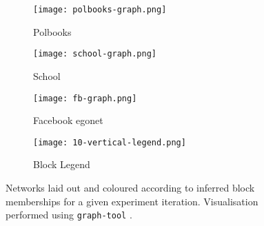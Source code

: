 \begin{figure}[!ht]
	\centering
	\begin{subfigure}[t]{0.28\linewidth}
		\centering
		\texttt{[image: polbooks-graph.png]}
		\caption{Polbooks}
		\label{fig:polbooks-graph}
	\end{subfigure}
	\hfill
	\begin{subfigure}[t]{0.28\linewidth}
		\centering
		\texttt{[image: school-graph.png]}
		\caption{School}
		\label{fig:school-graph}
	\end{subfigure}
	\hfill
	\begin{subfigure}[t]{0.28\linewidth}
		\centering
		\texttt{[image: fb-graph.png]}
		\caption{Facebook egonet}
		\label{fig:fb-graph}
	\end{subfigure}
	\begin{subfigure}[t]{0.11\linewidth}
		\centering
		\texttt{[image: 10-vertical-legend.png]}
		\caption{Block Legend}
		\label{fig:10-legend}
	\end{subfigure}
	\caption{Networks laid out and coloured according to inferred block memberships for a given experiment iteration. Visualisation performed using \texttt{graph-tool} \cite{peixoto_graph-tool_2014}.}
	\label{fig:graphs-all}
\end{figure}
%
\begin{table}[!ht]
	\centering
	\caption{Experimental results averaged over $n=10$ iterations (mean $\pm$ std. dev.).}
	\label{tab:results}
\end{table}
%

